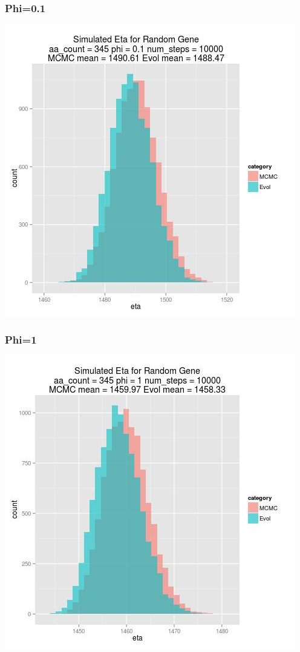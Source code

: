 \documentclass{article}
\begin{document}
\subsubsection{Phi=0.1}

\includegraphics[scale=.5]{../eta_distbns/01_phi.jpg}
\subsubsection{Phi=1}
\includegraphics[scale=0.5]{../eta_distbns/1_phi.jpg}
\end{document}
